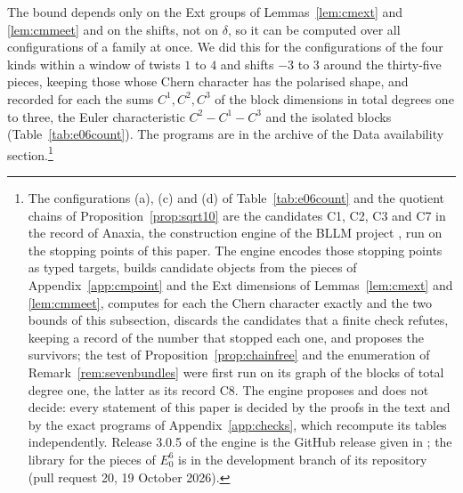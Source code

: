 \documentclass[11pt,reqno]{amsart}
\numberwithin{equation}{section}
\theoremstyle{plain}
\theoremstyle{definition}
\begin{document}
The bound depends only on the Ext groups of Lemmas~\ref{lem:cmext} and \ref{lem:cmmeet} and on the shifts, not on $\delta$, so it can be computed over all configurations of a family at once. We did this for the configurations of the four kinds within a window of twists $1$ to $4$ and shifts $-3$ to $3$ around the thirty-five pieces, keeping those whose Chern character has the polarised shape, and recorded for each the sums $C^{1},C^{2},C^{3}$ of the block dimensions in total degrees one to three, the Euler characteristic $C^{2}-C^{1}-C^{3}$ and the isolated blocks (Table~\ref{tab:e06count}). The programs are in the archive of the Data availability section.\footnote{The configurations (a), (c) and (d) of Table~\ref{tab:e06count} and the quotient chains of Proposition~\ref{prop:sqrt10} are the candidates C1, C2, C3 and C7 in the record of Anaxia, the construction engine of the BLLM project \cite{Bha26bllm}, run on the stopping points of this paper. The engine encodes those stopping points as typed targets, builds candidate objects from the pieces of Appendix~\ref{app:cmpoint} and the Ext dimensions of Lemmas~\ref{lem:cmext} and \ref{lem:cmmeet}, computes for each the Chern character exactly and the two bounds of this subsection, discards the candidates that a finite check refutes, keeping a record of the number that stopped each one, and proposes the survivors; the test of Proposition~\ref{prop:chainfree} and the enumeration of Remark~\ref{rem:sevenbundles} were first run on its graph of the blocks of total degree one, the latter as its record C8. The engine proposes and does not decide: every statement of this paper is decided by the proofs in the text and by the exact programs of Appendix~\ref{app:checks}, which recompute its tables independently. Release 3.0.5 of the engine is the GitHub release given in \cite{Bha26bllm}; the library for the pieces of $E_{0}^{6}$ is in the development branch of its repository (pull request 20, 19 October 2026).}
\end{document}
